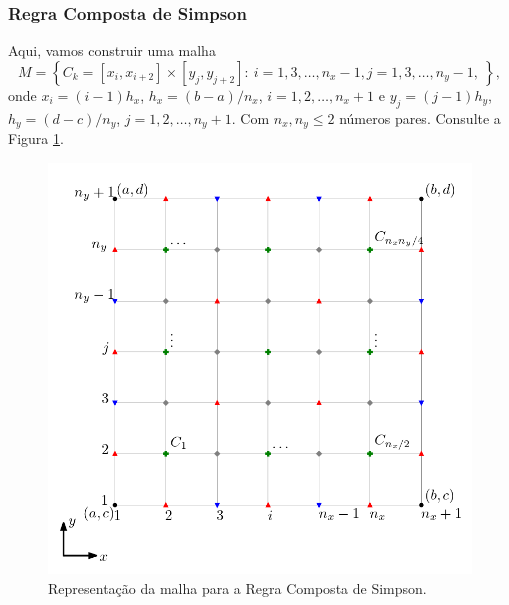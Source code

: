 \subsubsection{Regra Composta de Simpson}

Aqui, vamos construir uma malha
\begin{equation}
  M = \left\{C_k = [x_i,x_{i+2}]\times[y_j,y_{j+2}]:~i=1,3,\dotsc,n_x-1, j=1,3,\dotsc,n_y-1,~\right\},
\end{equation}
onde $x_i=(i-1)h_x$, $h_x=(b-a)/n_x$, $i=1,2,\dotsc,n_x+1$ e $y_j=(j-1)h_y$, $h_y=(d-c)/n_y$, $j=1,2,\dotsc,n_y+1$. Com $n_x,n_y\leq 2$ números pares. Consulte a Figura \ref{fig:malhaSim}.

\begin{figure}[H]
  \centering
  \includegraphics{./cap_integracao/dados/figMalhaSim/fig}
  \caption{Representação da malha para a Regra Composta de Simpson.}
  \label{fig:malhaSim}
\end{figure}

